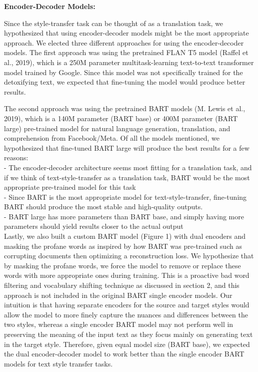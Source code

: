 \documentclass[11pt]{article}
\begin{document}
\textbf{Encoder-Decoder Models:}

Since the style-transfer task can be thought of as a translation task, we hypothesized that using encoder-decoder models might be the most appropriate approach. We elected three different approaches for using the encoder-decoder models. The first approach was using the pretrained FLAN T5 model (Raffel et al., 2019), which is a 250M parameter multitask-learning text-to-text transformer model trained by Google. Since this model was not specifically trained for the detoxifying text, we expected that fine-tuning the model would produce better results.

The second approach was using the pretrained BART models (M. Lewis et al., 2019), which is a 140M parameter (BART base) or 400M parameter (BART large) pre-trained model for natural language generation, translation, and comprehension from Facebook/Meta. Of all the models mentioned, we hypothesized that fine-tuned BART large will produce the best results for a few reasons: \\
- The encoder-decoder architecture seems most fitting for a translation task, and if we think of text-style-transfer as a translation task, BART would be the most appropriate pre-trained model for this task\\
- Since BART is the most appropriate model for text-style-transfer, fine-tuning BART should produce the most stable and high-quality outputs.\\
- BART large has more parameters than BART base, and simply having more parameters should yield results closer to the actual output\\
Lastly, we also built a custom BART model (Figure 1) with dual encoders and masking the profane words as inspired by how BART was pre-trained such as corrupting documents then optimizing a reconstruction loss. We hypothesize that by masking the profane words, we force the model to remove or replace these words with more appropriate ones during training. This is a proactive bad word filtering and vocabulary shifting technique as discussed in section 2, and this approach is not included in the original BART single encoder models. Our intuition is that having separate encoders for the source and target styles would allow the model to more finely capture the nuances and differences between the two styles, whereas a single encoder BART model may not perform well in preserving the meaning of the input text as they focus mainly on generating text in the target style. Therefore, given equal model size (BART base), we expected the dual encoder-decoder model to work better than the single encoder BART models for text style transfer tasks.\\
\end{document}

